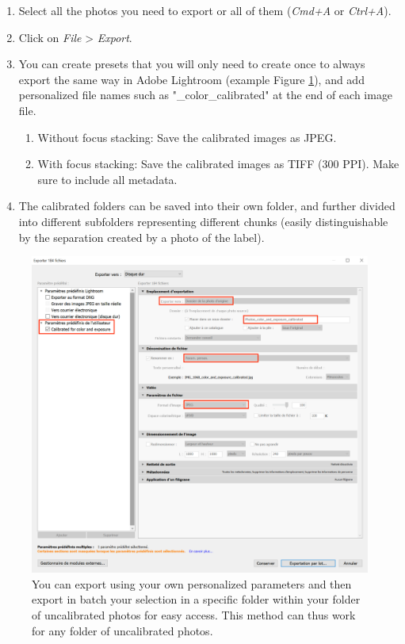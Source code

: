 \documentclass[
]{book}
\providecommand{\tightlist}{%
  \setlength{\itemsep}{0pt}\setlength{\parskip}{0pt}}
\begin{document}
\begin{enumerate}
\def\labelenumi{\arabic{enumi}.}
\item
  Select all the photos you need to export or all of them (\emph{Cmd+A} or
  \emph{Ctrl+A}).
\item
  Click on \emph{File} \textgreater{} \emph{Export}.
\item
  You can create presets that you will only need to create once to
  always export the same way in Adobe Lightroom (example Figure \ref{fig:exportparameters}), and add personalized file names such as "\_color\_calibrated" at the end of each image file.

  \begin{enumerate}
  \def\labelenumii{\alph{enumii}.}
  \tightlist
  \item
    Without focus stacking: Save the calibrated images as JPEG.
  \item
    With focus stacking: Save the calibrated images as TIFF (300 PPI). Make sure to include all metadata.
  \end{enumerate}
\item
  The calibrated folders can be saved into their own folder, and further divided
  into different subfolders representing different chunks (easily distinguishable
  by the separation created by a photo of the label).
\end{enumerate}

\begin{figure}

{\centering \includegraphics[width=0.8\linewidth]{Figures/export_capture_1} 

}

\caption{You can export using your own personalized parameters and then export in batch your selection in a specific folder within your folder of uncalibrated photos for easy access. This method can thus work for any folder of uncalibrated photos.}\label{fig:exportparameters}
\end{figure}
\end{document}
